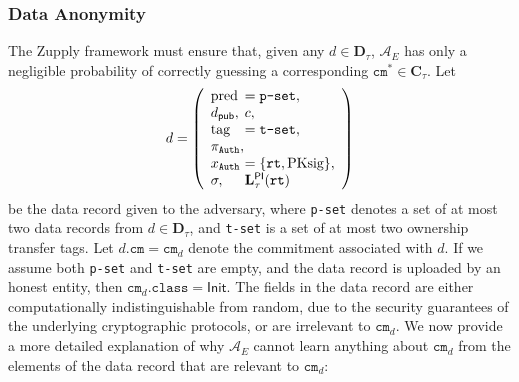 \subsubsection{Data Anonymity}
The Zupply framework must ensure that, given any $d \in \mathbf{D}_\tau$,  $\mathcal{A}_E$ has only a negligible probability of correctly guessing a corresponding $\texttt{cm}^\ast \in \mathbf{C}_\tau$.  Let
\begin{align*}
	d = \left( 
	\begin{array}{l@{\hspace{0.05em}}l}
		\text{pred} & = \texttt{p-set}, \\
		d_{\mathsf{pub}}, & c, \\
		\text{tag} & = \texttt{t-set}, \\
		\pi_{\texttt{Auth}}, & \\
		x_{\texttt{Auth}} & = \{\texttt{rt}, \text{PKsig}\}, \\
		\sigma, & \mathbf{L}_\tau^\mathsf{PI}(\texttt{rt})
	\end{array} 
	\right)
\end{align*}
be the data record given to the adversary, where \texttt{p-set} denotes a set of at most two data records from \( d \in \mathbf{D}_\tau \), and \texttt{t-set} is a set of at most two ownership transfer tags. Let \( d.\texttt{cm} = \texttt{cm}_d \) denote the commitment associated with \( d \). 
If we assume both  \texttt{p-set} and \texttt{t-set} are empty, and the data record is uploaded by an honest entity, then \(\texttt{cm}_d.\texttt{class} = \mathsf{Init}\). The fields in the data record are either computationally indistinguishable from random, due to the security guarantees of the underlying cryptographic protocols, or are irrelevant to \( \texttt{cm}_d \). We now provide a more detailed explanation of why \( \mathcal{A}_E \) cannot learn anything about \( \texttt{cm}_d \) from the elements of the data record that are relevant to \( \texttt{cm}_d \):
